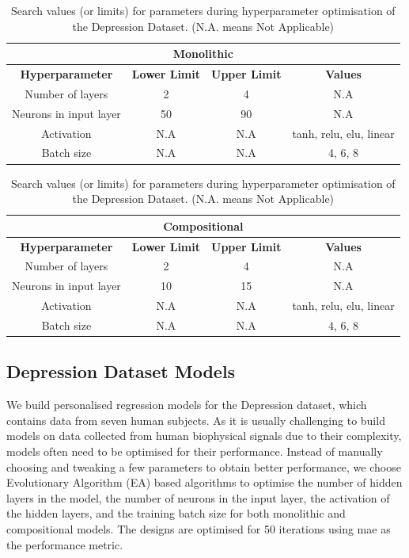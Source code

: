     
\begin{table}[htbp]
    \centering
    \caption{Search values (or limits) for parameters during hyperparameter optimisation of the Depression Dataset. (N.A. means Not Applicable)}
    \label{tab:optimiser_values_comp}
    \begin{tabular}{|c|ccc|}
      \hline
      \multicolumn{4}{|c|}{\textbf{Monolithic}} \\
      \hline
      \textbf{Hyperparameter} & \textbf{Lower Limit} & \textbf{Upper Limit} & \textbf{Values} \\
      \hline
      Number of layers & 2 & 4 & N.A \\
      Neurons in input layer & 50 & 90 & N.A \\
      Activation & N.A & N.A & tanh, relu, elu, linear \\
      Batch size & N.A & N.A & 4, 6, 8 \\
      \hline
    \end{tabular}
  
    \begin{tabular}{|c|ccc|}
      \hline
      \multicolumn{4}{|c|}{\textbf{Compositional}} \\
      \hline
      \textbf{Hyperparameter} & \textbf{Lower Limit} & \textbf{Upper Limit} & \textbf{Values} \\
      \hline
      Number of layers & 2 & 4 & N.A \\
      Neurons in input layer & 10 & 15 & N.A \\
      Activation & N.A & N.A & tanh, relu, elu, linear \\
      Batch size & N.A & N.A & 4, 6, 8 \\
      \hline
    \end{tabular}
  \end{table}
  
    



\subsection{Depression Dataset Models}
We build personalised regression models for the Depression dataset, which contains data from seven human subjects. As it is usually challenging to build models on data collected from human biophysical signals due to their complexity, models often need to be optimised for their performance. Instead of manually choosing and tweaking a few parameters to obtain better performance, we choose Evolutionary Algorithm (EA) based algorithms to optimise the number of hidden layers in the model, the number of neurons in the input layer, the activation of the hidden layers, and the training batch size for both monolithic and compositional models. The designs are optimised for 50 iterations using \gls{mae} as the performance metric.

